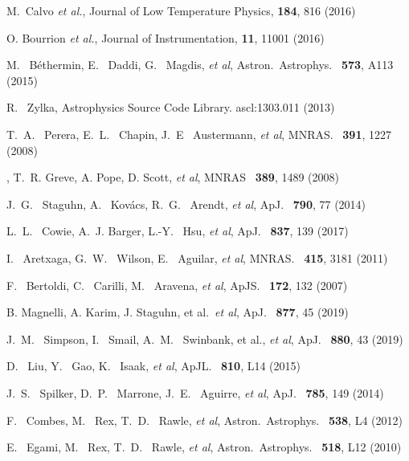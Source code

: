 \documentclass{webofc}
\begin{document}
\begin{thebibliography}{}
  M.~Calvo {\it et al.},
  Journal of Low Temperature Physics, {\bf 184}, 816 (2016)

  O. Bourrion {\it et al.},
  Journal of Instrumentation, {\bf 11}, 11001 (2016)
  

 M. ~B{\'e}thermin, E. ~Daddi, G. ~Magdis, {\it et al},
Astron.\ Astrophys. \ {\bf 573}, A113 (2015)

 R. ~Zylka, Astrophysics Source Code Library. ascl:1303.011 (2013)

 T.~A. ~Perera, E.~L. ~Chapin, J.~E ~Austermann, {\it et al},
MNRAS. \ {\bf 391}, 1227 (2008)

, T.~R. Greve, A. Pope, D. Scott, {\it et al},
MNRAS \ {\bf 389}, 1489 (2008)

 J.~G. ~Staguhn, A. ~Kov{\'a}cs,  R.~G. ~Arendt, {\it et al},
ApJ. \ {\bf 790}, 77 (2014)

 L.~L. ~Cowie, A.~J. Barger,  L.-Y. ~Hsu, {\it et al},
ApJ. \ {\bf 837}, 139 (2017)

 I. ~Aretxaga, G.~W. ~Wilson, E. ~Aguilar, {\it et al},
MNRAS. \ {\bf 415}, 3181 (2011)

 F. ~Bertoldi, C. ~Carilli, M. ~Aravena, {\it et al},
ApJS. \ {\bf 172}, 132 (2007)

 B. Magnelli, A. Karim, J. Staguhn, et al.\, {\it et al},
ApJ. \ {\bf 877}, 45 (2019)

 J.~M. ~Simpson, I. ~Smail, A.~M. ~Swinbank, et al., {\it et al},
ApJ. \ {\bf 880}, 43 (2019)

 D. ~Liu, Y. ~Gao, K. ~Isaak, {\it et al},
ApJL. \ {\bf 810}, L14 (2015)

 J.~S. ~Spilker, D.~P. ~Marrone, J.~E. ~Aguirre, {\it et al},
ApJ. \ {\bf 785}, 149 (2014)

 F. ~Combes, M. ~Rex, T.~D. ~Rawle, {\it et al},
Astron.\ Astrophys. \ {\bf 538}, L4 (2012)

 E. ~Egami, M. ~Rex, T.~D. ~Rawle, {\it et al}, Astron.\ Astrophys. \ {\bf 518}, L12 (2010)


\end{thebibliography}
\end{document}
